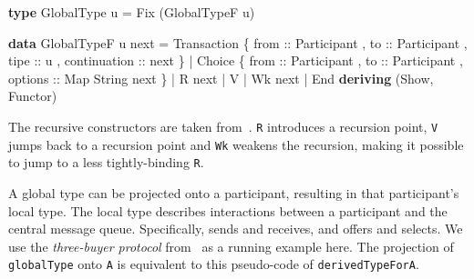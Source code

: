 \documentclass[runningheads]{llncs}
\newenvironment{Shaded}{}{}
\newcommand{\KeywordTok}[1]{\textcolor[rgb]{0.00,0.44,0.13}{\textbf{#1}}}
\newcommand{\DataTypeTok}[1]{\textcolor[rgb]{0.56,0.13,0.00}{#1}}
\newcommand{\OtherTok}[1]{\textcolor[rgb]{0.00,0.44,0.13}{#1}}
\newcommand{\FunctionTok}[1]{\textcolor[rgb]{0.02,0.16,0.49}{#1}}
\newcommand{\NormalTok}[1]{#1}
\begin{document}
\begin{Shaded}
\begin{Highlighting}[]
\KeywordTok{type} \DataTypeTok{GlobalType}\NormalTok{ u }\FunctionTok{=} \DataTypeTok{Fix}\NormalTok{ (}\DataTypeTok{GlobalTypeF}\NormalTok{ u)}

\KeywordTok{data} \DataTypeTok{GlobalTypeF}\NormalTok{ u next}
    \FunctionTok{=} \DataTypeTok{Transaction} 
\NormalTok{        \{}\OtherTok{ from ::} \DataTypeTok{Participant}
\NormalTok{        ,}\OtherTok{ to ::} \DataTypeTok{Participant}
\NormalTok{        ,}\OtherTok{ tipe ::}\NormalTok{ u}
\NormalTok{        ,}\OtherTok{ continuation ::}\NormalTok{  next }
\NormalTok{        \} }
    \FunctionTok{|} \DataTypeTok{Choice} 
\NormalTok{        \{}\OtherTok{ from ::} \DataTypeTok{Participant}
\NormalTok{        ,}\OtherTok{ to ::} \DataTypeTok{Participant}
\NormalTok{        ,}\OtherTok{ options ::} \DataTypeTok{Map} \DataTypeTok{String}\NormalTok{ next }
\NormalTok{        \}}
    \FunctionTok{|} \DataTypeTok{R}\NormalTok{ next}
    \FunctionTok{|} \DataTypeTok{V}
    \FunctionTok{|} \DataTypeTok{Wk}\NormalTok{ next}
    \FunctionTok{|} \DataTypeTok{End}
    \KeywordTok{deriving}\NormalTok{ (}\DataTypeTok{Show}\NormalTok{, }\DataTypeTok{Functor}\NormalTok{)}
\end{Highlighting}
\end{Shaded}

The recursive constructors are taken from~\cite{HYC08}. \texttt{R} introduces a
recursion point, \texttt{V} jumps back to a recursion point and
\texttt{Wk} weakens the recursion, making it possible to jump to a less
tightly-binding \texttt{R}.

A global type can be projected onto a participant, resulting in that
participant's local type. The local type describes interactions between
a participant and the central message queue. Specifically, sends and
receives, and offers and selects. We use the \emph{three-buyer protocol} from~\cite{DBLP:conf/ppdp/MezzinaP17}
as a running example here. The projection of \texttt{globalType} onto
\texttt{A} is equivalent to this pseudo-code of
\texttt{derivedTypeForA}.
\end{document}
